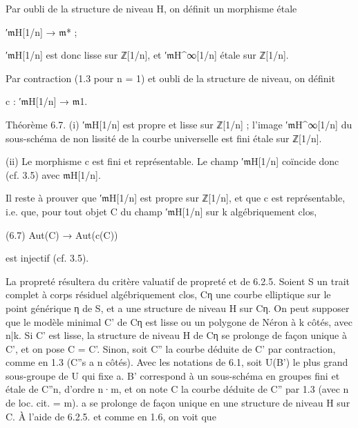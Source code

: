 \documentclass[11pt,a4paper]{article}
\begin{document}
Par oubli de la structure de niveau H, on définit un morphisme étale

′\ensuremath{\mathfrak{m}}\textunderscore{}H[1/n] → \ensuremath{\mathfrak{m}}\textunderscore{}* ;

′\ensuremath{\mathfrak{m}}\textunderscore{}H[1/n] est donc lisse sur ℤ[1/n], et ′\ensuremath{\mathfrak{m}}\textunderscore{}H\textasciicircum{}∞[1/n] étale sur ℤ[1/n].

Par contraction (1.3 pour n = 1) et oubli de la structure de niveau, on définit

c : ′\ensuremath{\mathfrak{m}}\textunderscore{}H[1/n] → \ensuremath{\mathfrak{m}}\textunderscore{}1.

Théorème 6.7. (i) ′\ensuremath{\mathfrak{m}}\textunderscore{}H[1/n] est propre et lisse sur ℤ[1/n] ; l'image ′\ensuremath{\mathfrak{m}}\textunderscore{}H\textasciicircum{}∞[1/n] du sous-schéma de non lissité de la courbe universelle est fini étale sur ℤ[1/n].

(ii) Le morphisme c est fini et représentable. Le champ ′\ensuremath{\mathfrak{m}}\textunderscore{}H[1/n] coïncide donc (cf. 3.5) avec \ensuremath{\mathfrak{m}}\textunderscore{}H[1/n].

Il reste à prouver que ′\ensuremath{\mathfrak{m}}\textunderscore{}H[1/n] est propre sur ℤ[1/n], et que c est représentable, i.e. que, pour tout objet C du champ ′\ensuremath{\mathfrak{m}}\textunderscore{}H[1/n] sur k algébriquement clos,

(6.7)        Aut(C) → Aut(c(C))

est injectif (cf. 3.5).

La propreté résultera du critère valuatif de propreté et de 6.2.5. Soient S un trait complet à corps résiduel algébriquement clos, C\textunderscore{}η une courbe elliptique sur le point générique η de S, et a une structure de niveau H sur C\textunderscore{}η. On peut supposer que le modèle minimal C' de C\textunderscore{}η est lisse ou un polygone de Néron à k côtés, avec n|k. Si C' est lisse, la structure de niveau H de C\textunderscore{}η se prolonge de façon unique à C', et on pose C = C'. Sinon, soit C'' la courbe déduite de C' par contraction, comme en 1.3 (C''\textunderscore{}s a n côtés). Avec les notations de 6.1, soit U(B') le plus grand sous-groupe de U qui fixe a. B' correspond à un sous-schéma en groupes fini et étale de C''\textunderscore{}n, d'ordre n·m, et on note C la courbe déduite de C'' par 1.3 (avec n de loc. cit. = m). a se prolonge de façon unique en une structure de niveau H sur C. À l'aide de 6.2.5. et comme en 1.6, on voit que
\end{document}
